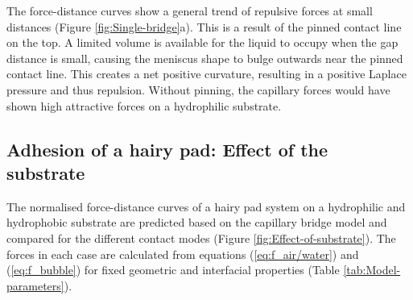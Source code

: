 \documentclass[vruler,JEB]{COB}%
\begin{document}
%
%

The force-distance curves show a general trend of repulsive forces
at small distances (Figure \ref{fig:Single-bridge}a). This is a result
of the pinned contact line on the top. A limited volume is available
for the liquid to occupy when the gap distance is small, causing the
meniscus shape to bulge outwards near the pinned contact line. This
creates a net positive curvature, resulting in a positive Laplace
pressure and thus repulsion. Without pinning, the capillary forces
would have shown high attractive forces on a hydrophilic substrate\citep{RN93}.

\subsection{Adhesion of a hairy pad: Effect of the substrate\label{subsec:Capillary-Bridge-Model:}}

The normalised force-distance curves of a hairy pad system on a hydrophilic
and hydrophobic substrate are predicted based on the capillary bridge
model and compared for the different contact modes (Figure \ref{fig:Effect-of-substrate}).
The forces in each case are calculated from equations (\ref{eq:f_air/water})
and (\ref{eq:f_bubble}) for fixed geometric and interfacial properties
(Table \ref{tab:Model-parameters}). 
\end{document}
